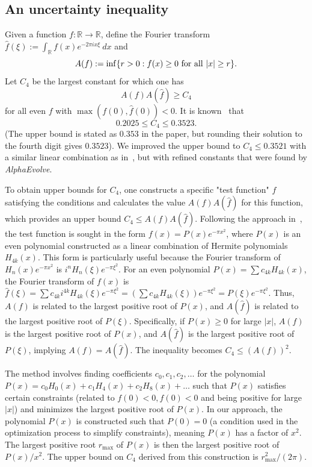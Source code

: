 \documentclass[logo,copyright,12pt]{googledeepmind}
\theoremstyle{definition}
\theoremstyle{remark}
\theoremstyle{plain}
\newcommand{\method}{\emph{AlphaEvolve}\xspace}
\begin{document}
\subsection{An uncertainty inequality}

Given a function $f: \mathbb{R} \to \mathbb{R}$, define the Fourier transform $\hat f(\xi) := \int_\mathbb{R} f(x) e^{-2\pi i x\xi}\ dx$ and
$$ A(f) := \inf \{r > 0: f(x) \geq 0 \hbox{ for all } |x| \geq r \}.$$
Let $C_4$ be the largest constant for which one has
$$ A(f) A(\hat f) \geq C_4$$
for all even $f$ with $\max(f(0), \hat f(0)) < 0$.  It is known~\cite{gonccalves2017hermite} that
$$ 0.2025 \leq C_4 \leq 0.3523.$$
(The upper bound is stated as $0.353$ in the paper, but rounding their solution to the fourth digit gives $0.3523$).
We improved the upper bound to $C_4 \leq 0.3521$ with a similar linear combination as in~\cite{gonccalves2017hermite}, but with refined constants that were found by \method.

To obtain upper bounds for $C_4$, one constructs a specific "test function" $f$ satisfying the conditions and calculates the value $A(f)A(\hat f)$ for this function, which provides an upper bound $C_4 \le A(f)A(\hat f)$. Following the approach in~\cite{gonccalves2017hermite}, the test function is sought in the form $f(x) = P(x)e^{-\pi x^2}$, where $P(x)$ is an even polynomial constructed as a linear combination of Hermite polynomials $H_{4k}(x)$. This form is particularly useful because the Fourier transform of $H_n(x)e^{-\pi x^2}$ is $i^n H_n(\xi)e^{-\pi \xi^2}$. For an even polynomial $P(x) = \sum c_{4k} H_{4k}(x)$, the Fourier transform of $f(x)$ is $\hat f(\xi) = \sum c_{4k} i^{4k} H_{4k}(\xi)e^{-\pi \xi^2} = (\sum c_{4k} H_{4k}(\xi))e^{-\pi \xi^2} = P(\xi)e^{-\pi \xi^2}$. Thus, $A(f)$ is related to the largest positive root of $P(x)$, and $A(\hat f)$ is related to the largest positive root of $P(\xi)$. Specifically, if $P(x) \ge 0$ for large $|x|$, $A(f)$ is the largest positive root of $P(x)$, and $A(\hat f)$ is the largest positive root of $P(\xi)$, implying $A(f) = A(\hat f)$. The inequality becomes $C_4 \le (A(f))^2$.

The method involves finding coefficients $c_0, c_1, c_2, \dots$ for the polynomial $P(x) = c_0 H_0(x) + c_1 H_4(x) + c_2 H_8(x) + \dots$ such that $P(x)$ satisfies certain constraints (related to $f(0)<0, \hat f(0)<0$ and being positive for large $|x|$) and minimizes the largest positive root of $P(x)$. In our approach, the polynomial $P(x)$ is constructed such that $P(0)=0$ (a condition used in the optimization process to simplify constraints), meaning $P(x)$ has a factor of $x^2$. The largest positive root $r_{\max}$ of $P(x)$ is then the largest positive root of $P(x)/x^2$. The upper bound on $C_4$ derived from this construction is $r_{\max}^2 / (2\pi)$.
\end{document}
